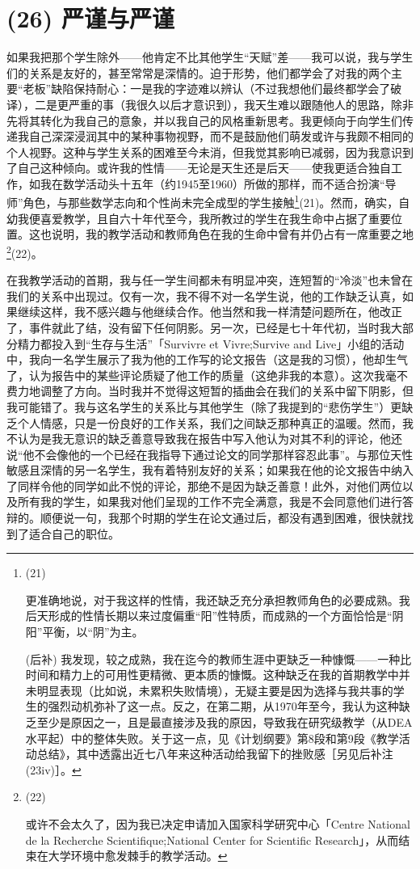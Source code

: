 \section{(26) 严谨与严谨}

如果我把那个学生除外——他肯定不比其他学生“天赋”差——我可以说，我与学生们的关系是友好的，甚至常常是深情的。迫于形势，他们都学会了对我的两个主要“老板”缺陷保持耐心：一是我的字迹难以辨认（不过我想他们最终都学会了破译），二是更严重的事（我很久以后才意识到），我天生难以跟随他人的思路，除非先将其转化为我自己的意象，并以我自己的风格重新思考。我更倾向于向学生们传递我自己深深浸润其中的某种事物视野，而不是鼓励他们萌发或许与我颇不相同的个人视野。这种与学生关系的困难至今未消，但我觉其影响已减弱，因为我意识到了自己这种倾向。或许我的性情——无论是天生还是后天——使我更适合独自工作，如我在数学活动头十五年（约1945至1960）所做的那样，而不适合扮演“导师”角色，与那些数学志向和个性尚未完全成型的学生接触\footnote{(21)\par 更准确地说，对于我这样的性情，我还缺乏充分承担教师角色的必要成熟。我后天形成的性情长期以来过度偏重“阳”性特质，而成熟的一个方面恰恰是“阴阳”平衡，以“阴”为主。

(后补) 我发现，较之成熟，我在迄今的教师生涯中更缺乏一种慷慨——一种比时间和精力上的可用性更精微、更本质的慷慨。这种缺乏在我的首期教学中并未明显表现（比如说，未累积失败情境），无疑主要是因为选择与我共事的学生的强烈动机弥补了这一点。反之，在第二期，从1970年至今，我认为这种缺乏至少是原因之一，且是最直接涉及我的原因，导致我在研究级教学（从DEA水平起）中的整体失败。关于这一点，见《计划纲要》第8段和第9段《教学活动总结》，其中透露出近七八年来这种活动给我留下的挫败感［另见后补注(23iv)］。}(21)。然而，确实，自幼我便喜爱教学，且自六十年代至今，我所教过的学生在我生命中占据了重要位置。这也说明，我的教学活动和教师角色在我的生命中曾有并仍占有一席重要之地\footnote{(22)\par 或许不会太久了，因为我已决定申请加入国家科学研究中心「Centre National de la Recherche Scientifique;National Center for Scientific Research」，从而结束在大学环境中愈发棘手的教学活动。}(22)。

在我教学活动的首期，我与任一学生间都未有明显冲突，连短暂的“冷淡”也未曾在我们的关系中出现过。仅有一次，我不得不对一名学生说，他的工作缺乏认真，如果继续这样，我不感兴趣与他继续合作。他当然和我一样清楚问题所在，他改正了，事件就此了结，没有留下任何阴影。另一次，已经是七十年代初，当时我大部分精力都投入到“生存与生活”「Survivre et Vivre;Survive and Live」小组的活动中，我向一名学生展示了我为他的工作写的论文报告（这是我的习惯），他却生气了，认为报告中的某些评论质疑了他工作的质量（这绝非我的本意）。这次我毫不费力地调整了方向。当时我并不觉得这短暂的插曲会在我们的关系中留下阴影，但我可能错了。我与这名学生的关系比与其他学生（除了我提到的“悲伤学生”）更缺乏个人情感，只是一份良好的工作关系，我们之间缺乏那种真正的温暖。然而，我不认为是我无意识的缺乏善意导致我在报告中写入他认为对其不利的评论，他还说“他不会像他的一个已经在我指导下通过论文的同学那样容忍此事”。与那位天性敏感且深情的另一名学生，我有着特别友好的关系；如果我在他的论文报告中纳入了同样令他的同学如此不悦的评论，那绝不是因为缺乏善意！此外，对他们两位以及所有我的学生，如果我对他们呈现的工作不完全满意，我是不会同意他们进行答辩的。顺便说一句，我那个时期的学生在论文通过后，都没有遇到困难，很快就找到了适合自己的职位。

